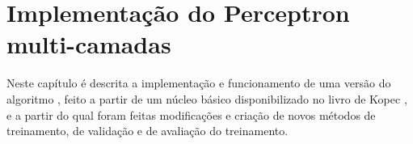 
\chapter{Implementação do Perceptron multi-camadas}
\label{cap:perceptron}

Neste capítulo é descrita a implementação e funcionamento de uma versão do algoritmo , feito a partir de um núcleo básico disponibilizado no livro de Kopec \citep{classic}, e a partir do qual foram feitas modificações e criação de novos métodos de treinamento, de validação e de avaliação do treinamento.
